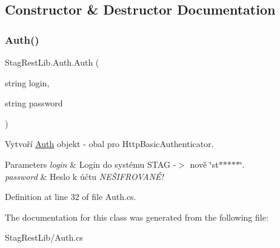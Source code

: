 \subsection{Constructor \& Destructor Documentation}
\mbox{\label{class_stag_rest_lib_1_1_auth_a0f259ec6ee35c07ebd181136775dec90}} 
\subsubsection{\texorpdfstring{Auth()}{Auth()}}
{\footnotesize\ttfamily Stag\+Rest\+Lib.\+Auth.\+Auth (\begin{DoxyParamCaption}\item[{string}]{login,  }\item[{string}]{password }\end{DoxyParamCaption})}



Vytvoří \hyperlink{class_stag_rest_lib_1_1_auth}{Auth} objekt -\/ obal pro Http\+Basic\+Authenticator. 


\begin{DoxyParams}{Parameters}
{\em login} & Login do systému S\+T\+AG -\/$>$ nově \char`\"{}st$\ast$$\ast$$\ast$$\ast$$\ast$\char`\"{}.\\
\hline
{\em password} & Heslo k účtu {\itshape N\+EŠ\+I\+F\+R\+O\+V\+A\+NÉ!}\\
\hline
\end{DoxyParams}


Definition at line 32 of file Auth.\+cs.



The documentation for this class was generated from the following file\+:\begin{DoxyCompactItemize}
\item 
Stag\+Rest\+Lib/Auth.\+cs\end{DoxyCompactItemize}
